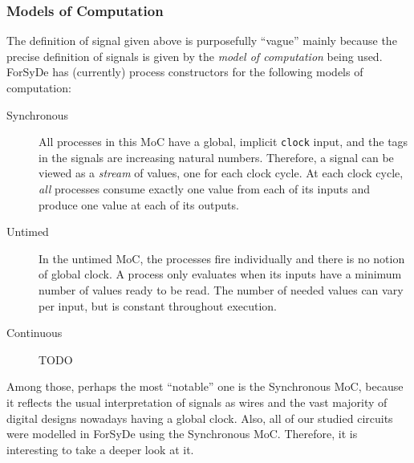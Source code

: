 \documentclass[a4paper]{article}
\begin{document}
            \subsubsection{Models of Computation}
            \label{subsubsec:forsyde-mocs}
                The definition of signal given above is purposefully ``vague'' mainly because the
                precise definition of signals is given by the \emph{model of computation} being
                used. ForSyDe has (currently) process constructors for the following models of
                computation:
                \begin{description}
                    \item[Synchronous] All processes in this MoC have a global, implicit
                        \texttt{clock} input, and the tags in the signals are increasing natural
                        numbers. Therefore, a signal can be viewed as a \emph{stream} of values, one
                        for each clock cycle. At each clock cycle, \emph{all} processes consume
                        exactly one value from each of its inputs and produce one value at each of
                        its outputs.

                    \item[Untimed] In the untimed MoC, the processes fire individually and there is
                        no notion of global clock. A process only evaluates when its inputs have a
                        minimum number of values ready to be read. The number of needed values can
                        vary per input, but is constant throughout execution.

                    \item[Continuous] TODO
                \end{description}

                Among those, perhaps the most ``notable'' one is the Synchronous MoC, because it
                reflects the usual interpretation of signals as wires and the vast majority of
                digital designs nowadays having a global clock. Also, all of our studied circuits
                were modelled in ForSyDe using the Synchronous MoC. Therefore, it is interesting to
                take a deeper look at it.
\end{document}
